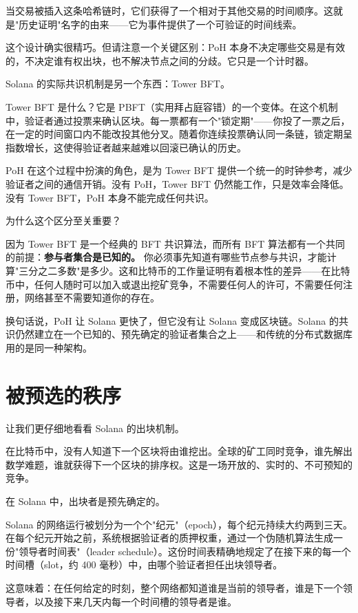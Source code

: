 \documentclass[a4paper,12pt,openany]{ctexbook}
\begin{document}
当交易被插入这条哈希链时，它们获得了一个相对于其他交易的时间顺序。这就是"历史证明"名字的由来——它为事件提供了一个可验证的时间线索。

这个设计确实很精巧。但请注意一个关键区别：PoH 本身不决定哪些交易是有效的，不决定谁有权出块，也不解决节点之间的分歧。它只是一个计时器。

Solana 的实际共识机制是另一个东西：Tower BFT。

Tower BFT 是什么？它是 PBFT（实用拜占庭容错）的一个变体。在这个机制中，验证者通过投票来确认区块。每一票都有一个"锁定期"——你投了一票之后，在一定的时间窗口内不能改投其他分叉。随着你连续投票确认同一条链，锁定期呈指数增长，这使得验证者越来越难以回滚已确认的历史。

PoH 在这个过程中扮演的角色，是为 Tower BFT 提供一个统一的时钟参考，减少验证者之间的通信开销。没有 PoH，Tower BFT 仍然能工作，只是效率会降低。没有 Tower BFT，PoH 本身不能完成任何共识。

为什么这个区分至关重要？

因为 Tower BFT 是一个经典的 BFT 共识算法，而所有 BFT 算法都有一个共同的前提：\textbf{参与者集合是已知的。} 你必须事先知道有哪些节点参与共识，才能计算"三分之二多数"是多少。这和比特币的工作量证明有着根本性的差异——在比特币中，任何人随时可以加入或退出挖矿竞争，不需要任何人的许可，不需要任何注册，网络甚至不需要知道你的存在。

换句话说，PoH 让 Solana 更快了，但它没有让 Solana 变成区块链。Solana 的共识仍然建立在一个已知的、预先确定的验证者集合之上——和传统的分布式数据库用的是同一种架构。


\section*{被预选的秩序}


让我们更仔细地看看 Solana 的出块机制。

在比特币中，没有人知道下一个区块将由谁挖出。全球的矿工同时竞争，谁先解出数学难题，谁就获得下一个区块的排序权。这是一场开放的、实时的、不可预知的竞争。

在 Solana 中，出块者是预先确定的。

Solana 的网络运行被划分为一个个"纪元"（epoch），每个纪元持续大约两到三天。在每个纪元开始之前，系统根据验证者的质押权重，通过一个伪随机算法生成一份"领导者时间表"（leader schedule）。这份时间表精确地规定了在接下来的每一个时间槽（slot，约 400 毫秒）中，由哪个验证者担任出块领导者。

这意味着：在任何给定的时刻，整个网络都知道谁是当前的领导者，谁是下一个领导者，以及接下来几天内每一个时间槽的领导者是谁。
\end{document}
